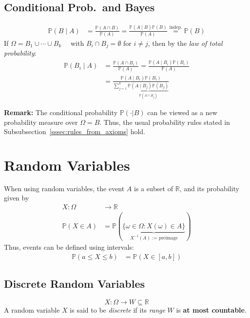 \subsection{Conditional Prob.\ and Bayes}
\noindent\begin{align*}
    \mathbb{P}(B\mid A) & =\frac{\mathbb{P}(A\cap B)}{\mathbb{P}(A)}=\frac{\mathbb{P}(A\mid B)\mathbb{P}(B)}{\mathbb{P}(A)} \overset{\text{indep.}}{=} \mathbb{P}(B)
\end{align*}
If $\Omega=B_1\cup\cdots\cup B_k\quad$ with $B_i\cap B_j=\emptyset$ for $i\neq j$, then by the \textit{law of total probability}:
\noindent\begin{align*}
    \mathbb{P}(B_i\mid A) & =\frac{\mathbb{P}(A\cap B_i)}{\mathbb{P}(A)}=\frac{\mathbb{P}(A\mid B_i)\mathbb{P}(B_i)}{\mathbb{P}(A)}                              \\
                          & =\frac{\mathbb{P}(A\mid B_i)\mathbb{P}(B_i)}{\sum_{j=1}^k \underbrace{\mathbb{P}(A\mid B_j)\mathbb{P}(B_j)}_{\mathbb{P}(A\cap B_j)}}
\end{align*}

\textbf{Remark:} The conditional probability $\mathbb{P}(\cdot|B)$ can be viewed as a new probability measure over $\Omega=B$. Thus, the usual probability rules stated in Subsubsection\ \ref{sssec:rules_from_axioms} hold.

\section{Random Variables}
When using random variables, the event $A$ is a subset of $\mathbb{R}$, and its probability given by
\noindent\begin{align*}
    X : \Omega         & \rightarrow \mathbb{R}                                                                      \\
    \mathbb{P}(X\in A) & =\mathbb{P}(\underbrace{\{\omega\in\Omega:X(\omega)\in A\}}_{X^{-1}(A)\text{ := preimage}})
\end{align*}
Thus, events can be defined using intervals:
\noindent\begin{align*}
    \mathbb{P}(a\leq X\leq b) & =\mathbb{P}(X\in[a,b])
\end{align*}

\subsection{Discrete Random Variables}
\noindent\begin{equation*}
    X:\Omega\rightarrow W\subseteq\mathbb{R}
\end{equation*}
A random variable $X$ is said to be \textit{discrete} if its \textit{range} $W$ is \textbf{at most countable}.
\newpar{}

